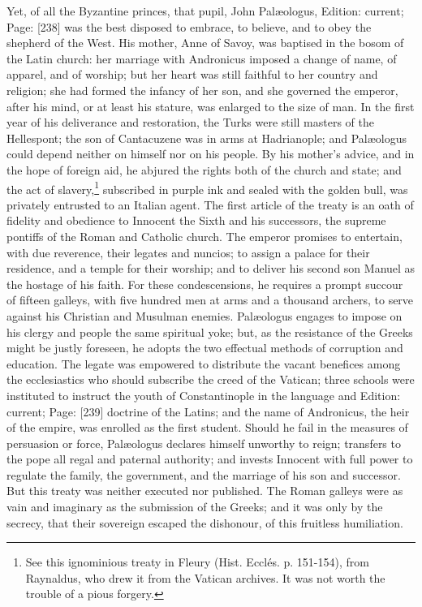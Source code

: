 Yet, of all the Byzantine princes, that pupil, John Palæologus, Edition: current; Page: [238] was the best disposed to embrace, to believe, and to obey the shepherd of the West. His mother, Anne of Savoy, was baptised in the bosom of the Latin church: her marriage with Andronicus imposed a change of name, of apparel, and of worship; but her heart was still faithful to her country and religion; she had formed the infancy of her son, and she governed the emperor, after his mind, or at least his stature, was enlarged to the size of man. In the first year of his deliverance and restoration, the Turks were still masters of the Hellespont; the son of Cantacuzene was in arms at Hadrianople; and Palæologus could depend neither on himself nor on his people. By his mother\texthebrew{}’s advice, and in the hope of foreign aid, he abjured the rights both of the church and state; and the act of slavery,\footnote{See this ignominious treaty in Fleury (Hist. Ecclés. p. 151-154), from Raynaldus, who drew it from the Vatican archives. It was not worth the trouble of a pious forgery.} subscribed in purple ink and sealed with the golden bull, was privately entrusted to an Italian agent. The first article of the treaty is an oath of fidelity and obedience to Innocent the Sixth and his successors, the supreme pontiffs of the Roman and Catholic church. The emperor promises to entertain, with due reverence, their legates and nuncios; to assign a palace for their residence, and a temple for their worship; and to deliver his second son Manuel as the hostage of his faith. For these condescensions, he requires a prompt succour of fifteen galleys, with five hundred men at arms and a thousand archers, to serve against his Christian and Musulman enemies. Palæologus engages to impose on his clergy and people the same spiritual yoke; but, as the resistance of the Greeks might be justly foreseen, he adopts the two effectual methods of corruption and education. The legate was empowered to distribute the vacant benefices among the ecclesiastics who should subscribe the creed of the Vatican; three schools were instituted to instruct the youth of Constantinople in the language and Edition: current; Page: [239] doctrine of the Latins; and the name of Andronicus, the heir of the empire, was enrolled as the first student. Should he fail in the measures of persuasion or force, Palæologus declares himself unworthy to reign; transfers to the pope all regal and paternal authority; and invests Innocent with full power to regulate the family, the government, and the marriage of his son and successor. But this treaty was neither executed nor published. The Roman galleys were as vain and imaginary as the submission of the Greeks; and it was only by the secrecy, that their sovereign escaped the dishonour, of this fruitless humiliation.

